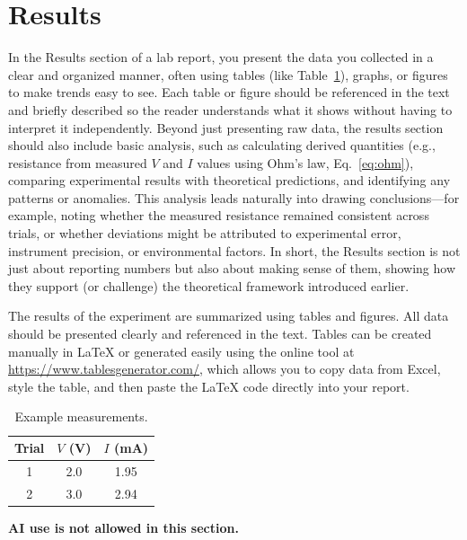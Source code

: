 \documentclass[11pt,a4paper]{article}
\begin{document}
    \section{Results}
        In the Results section of a lab report, you present the data you collected in a clear and organized manner, often using tables (like Table~\ref{tab:example}), graphs, or figures to make trends easy to see. Each table or figure should be referenced in the text and briefly described so the reader understands what it shows without having to interpret it independently. Beyond just presenting raw data, the results section should also include basic analysis, such as calculating derived quantities (e.g., resistance from measured $V$ and $I$ values using Ohm’s law, Eq.~\ref{eq:ohm}), comparing experimental results with theoretical predictions, and identifying any patterns or anomalies. This analysis leads naturally into drawing conclusions—for example, noting whether the measured resistance remained consistent across trials, or whether deviations might be attributed to experimental error, instrument precision, or environmental factors. In short, the Results section is not just about reporting numbers but also about making sense of them, showing how they support (or challenge) the theoretical framework introduced earlier.
        
        The results of the experiment are summarized using tables and figures. All data should be presented clearly and referenced in the text. Tables can be created manually in LaTeX or generated easily using the online tool at \url{https://www.tablesgenerator.com/}, which allows you to copy data from Excel, style the table, and then paste the LaTeX code directly into your report.
    
        \begin{table}[htb!]
          \centering
          \caption{Example measurements.}
          \label{tab:example}
          \begin{tabular}{@{}ccc@{}}
            \toprule
            Trial & $V$ (V) & $I$ (mA) \\
            \midrule
            1 & 2.0 & 1.95 \\
            2 & 3.0 & 2.94 \\
            \bottomrule
          \end{tabular}
        \end{table}
        \noindent \textbf{AI use is not allowed in this section.}     
        
\end{document}
